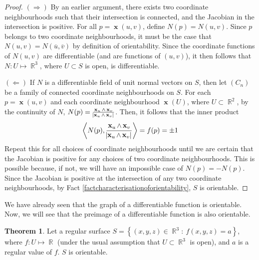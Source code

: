 \documentclass{amsart} %
\theoremstyle{mytheoremstyle}
\theoremstyle{definition}
\newtheorem{theorem}[definition]{Theorem}
\numberwithin{equation}{section}
\DeclareMathOperator{\R}{\mathbb{R}}
\DeclareMathOperator{\1}{\mathbbm{1}}
\DeclareMathOperator{\x}{\mathbf{x}}
\newcommand{\condset}[4]{\left\{ #1  : \: #2 #3 #4 \right\}}
\newcommand{\innerproduct}[2]{\left\langle #1,#2 \right\rangle}
\begin{document}
\begin{proof}
	$(\Rightarrow)$ By an earlier argument, there exists two coordinate neighbourhoods such that their intersection is connected, and the Jacobian in the intersection is positive. For all $p = \x(u,v)$, define $N(p) = N(u,v)$. Since $p $ belongs to two coordinate neighbourhoods, it must be the case that $N(u,v) = N(\overline{u},\overline{v})$ by definition of orientability. Since the coordinate functions of $N(u,v)$ are differentiable (and are functions of $(u,v)$), it then follows that $N : U \mapsto \R^3$, where $U \subset S $ is open, is differentiable.
	
	
	$(\Leftarrow)$ If $N$ is a differentiable field of unit normal vectors on $S$, then let $(C_n)$ be a family of connected coordinate neighbourhoods on $S$. For each $p = \x(u,v)$ and each coordinate neighbourhood $\x(U)$, where $U \subset \R^2$, by the continuity of $N$, $N(p) = \frac{\x_u \wedge \x_v}{\abs{\x_u \wedge \x_v}} $. Then, it follows that the inner product
	\begin{align*}
	\innerproduct{N(p)}{\frac{\x_u \wedge \x_v}{\abs{\x_u \wedge \x_v}} } = f(p) = \pm 1
	\end{align*}
	Repeat this for all choices of coordinate neighbourhoods until we are certain that the Jacobian is positive for any choices of two coordinate neighbourhoods. This is possible because, if not, we will have an impossible case of $N(p) = -N(p)$. Since the Jacobian is positive at the intersection of any two coordinate neighbourhoods, by Fact \ref{factcharacterisationoforientability}, $S$ is orientable.
\end{proof}

We have already seen that the graph of a differentiable function is orientable. Now, we will see that the preimage of a differentiable function is also orientable.

\begin{theorem}
	\label{thmpreimageofregularvaluedifffunctionisorientable}
	Let a regular surface $S = \condset{(x,y,z) \in \R^3}{f(x,y,z)}{=}{a}$, where $f : U \mapsto \R$ (under the usual assumption that $U \subset \R^3$ is open), and $a $ is a regular value of $f$. $S$ is orientable.
\end{theorem}
\end{document}
